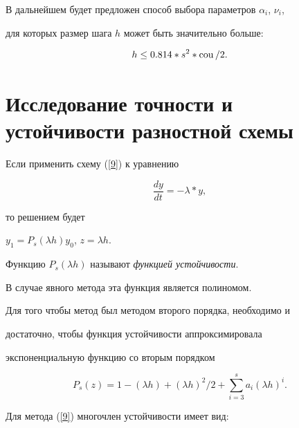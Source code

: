 В дальнейшем будет предложен способ выбора параметров $\alpha_i$, $\nu_i$,


для которых размер шага $h$ может быть значительно больше:


\begin{equation}


h\le 0.814*s^2*\cou/2.


\label{8'}


\end{equation}





\section{Исследование точности и устойчивости разностной схемы}





Если применить схему (\ref{9}) к уравнению


$$




\frac{dy}{dt}=-\lambda*y,






$$


то решением будет


$y_1=P_s(\lambda h)y_0$, $z=\lambda h$.


Функцию $P_s(\lambda h)$ называют {\it функцией устойчивости}.





В случае явного метода эта функция является полиномом.


Для того чтобы метод был методом второго порядка, необходимо и


достаточно, чтобы функция устойчивости аппроксимировала


экспоненциальную функцию со вторым порядком \cite{9}


\begin{equation}


P_s (z)=1-(\lambda h)+(\lambda h)^2/2 +


\sum_{i=3}^{s} a_i (\lambda h)^i.


\label{12}


\end{equation}


Для метода (\ref{9}) многочлен устойчивости имеет вид:


